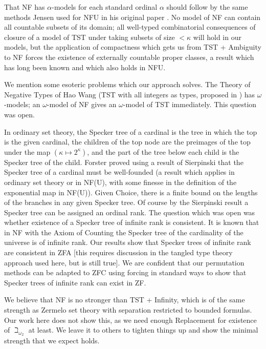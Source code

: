 \documentclass[12pt]{article}
\begin{document}
That NF has $\alpha$-models for each standard ordinal $\alpha$ should follow by the same methods Jensen used for NFU in his original paper \cite{nfu}.   No model of NF can contain all countable subsets of its domain;  all well-typed combinatorial consequences
of closure of a model of TST under taking subsets of size $<\kappa$ will hold in our models, but the application of compactness which gets us from TST + Ambiguity to NF forces the existence of externally countable proper classes, a result which has long been known and which also holds in NFU.

We mention some esoteric problems which our approach solves.  The Theory of Negative Types of Hao Wang (TST with all integers as types, proposed in \cite{tnt})  has $\omega$-models;  an $\omega$-model of NF gives an $\omega$-model of TST immediately.  This question was open.

In ordinary set theory, the Specker tree of a cardinal is the tree in which the top is the given cardinal, the children of the top node  are the preimages of the top under the map $(\kappa \mapsto 2^{\kappa})$, and the part of the tree
below each child is the Specker tree of the child.  Forster proved using a result of Sierpinski that the Specker tree of a cardinal must be well-founded (a result which applies in ordinary set theory or in NF(U), with some finesse in the definition of the exponential map in NF(U)).  Given Choice, there is a finite bound on the lengths of the branches in any given Specker tree.  Of course by the Sierpinski result a Specker tree can be assigned an ordinal rank.  The question which was open
was whether existence of a Specker tree of infinite rank is consistent.  It is known that in NF with the Axiom of Counting the Specker tree of the cardinality of the universe is of infinite rank.  Our results show that Specker trees of infinite rank are consistent in ZFA [this requires discussion in the tangled type theory approach used here, but is still true].  We are confident that our permutation methods can be adapted to ZFC using forcing in standard ways to show that Specker trees of infinite rank can exist in ZF.

We believe that NF is no stronger than TST + Infinity, which is of the same strength as Zermelo set theory with separation restricted to bounded formulas.  Our work here does not show this, as we need enough Replacement for
existence of $\beth_{\omega_2}$ at least.  We leave it to others to tighten things up and show the minimal strength that we expect holds.
\end{document}

